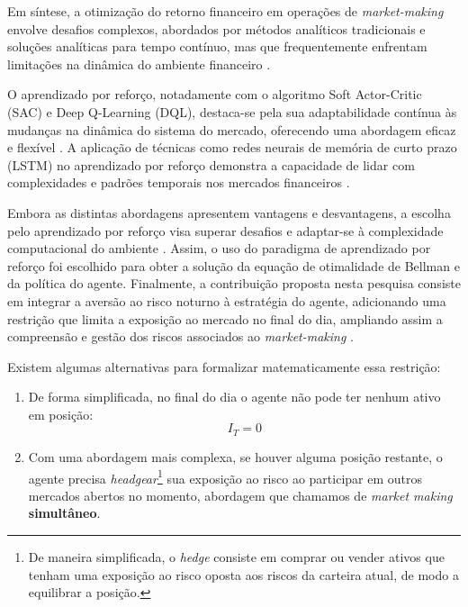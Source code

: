 Em síntese, a otimização do retorno financeiro em operações de \textit{market-making} envolve desafios complexos, abordados por métodos analíticos tradicionais e soluções analíticas para tempo contínuo, mas que frequentemente enfrentam limitações na dinâmica do ambiente financeiro \citep{Avellaneda2008, rao2020stochastic, Gasperov2021}.

O aprendizado por reforço, notadamente com o algoritmo Soft Actor-Critic (SAC) e Deep Q-Learning (DQL), destaca-se pela sua adaptabilidade contínua às mudanças na dinâmica do sistema do mercado, oferecendo uma abordagem eficaz e flexível \citep{Ganesh2019, bakshaev2020marketmaking, Sutton2018}. A aplicação de técnicas como redes neurais de memória de curto prazo (LSTM) no aprendizado por reforço demonstra a capacidade de lidar com complexidades e padrões temporais nos mercados financeiros \citep{WOS:000747190900001}.

Embora as distintas abordagens apresentem vantagens e desvantagens, a escolha pelo aprendizado por reforço visa superar desafios e adaptar-se à complexidade computacional do ambiente \citep{WOS:000963297000001}. Assim, o uso do paradigma de aprendizado por reforço foi escolhido para obter a solução da equação de otimalidade de Bellman e da política do agente. Finalmente, a contribuição proposta nesta pesquisa consiste em integrar a aversão ao risco noturno à estratégia do agente, adicionando uma restrição que limita a exposição ao mercado no final do dia, ampliando assim a compreensão e gestão dos riscos associados ao \textit{market-making} \citep{almgren2000}. 

Existem algumas alternativas para formalizar matematicamente essa restrição:
\begin{enumerate}
    \item De forma simplificada, no final do dia o agente não pode ter nenhum ativo em posição: 
    \begin{equation}
        I_{T} = 0
        \label{eq:inventory_restriction}
    \end{equation}
    \item Com uma abordagem mais complexa, se houver alguma posição restante, o agente precisa \textit{headgear}\footnote{De maneira simplificada, o \textit{hedge} consiste em comprar ou vender ativos que tenham uma exposição ao risco oposta aos riscos da carteira atual, de modo a equilibrar a posição.} sua exposição ao risco ao participar em outros mercados abertos no momento, abordagem que chamamos de \textit{market making} \textbf{simultâneo}.
\end{enumerate}
